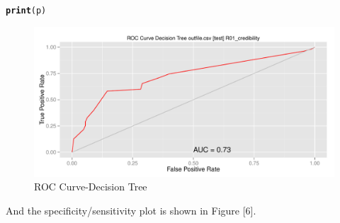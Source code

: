 \documentclass{article}\usepackage[]{graphicx}\usepackage[]{color}
\makeatletter
\def\maxwidth{ %
  \ifdim\Gin@nat@width>\linewidth
    \linewidth
  \else
    \Gin@nat@width
  \fi
}
\newcommand{\hlstd}[1]{\textcolor[rgb]{0.345,0.345,0.345}{#1}}%
\newcommand{\hlkwd}[1]{\textcolor[rgb]{0.737,0.353,0.396}{\textbf{#1}}}%
\newenvironment{kframe}{%
 \def\at@end@of@kframe{}%
 \ifinner\ifhmode%
  \def\at@end@of@kframe{\end{minipage}}%
  \begin{minipage}{\columnwidth}%
 \fi\fi%
 \def\FrameCommand##1{\hskip\@totalleftmargin \hskip-\fboxsep
 \colorbox{shadecolor}{##1}\hskip-\fboxsep
     \hskip-\linewidth \hskip-\@totalleftmargin \hskip\columnwidth}%
 \MakeFramed {\advance\hsize-\width
   \@totalleftmargin\z@ \linewidth\hsize
   \@setminipage}}%
 {\par\unskip\endMakeFramed%
 \at@end@of@kframe}
\newenvironment{knitrout}{}{} %
\makeatother
\begin{document}
\begin{knitrout}
\color{fgcolor}\begin{kframe}
\begin{alltt}
\hlkwd{print}\hlstd{(p)}
\end{alltt}
\end{kframe}\begin{figure}
\includegraphics[width=\maxwidth]{figure/unnamed-chunk-44-1} \caption[ROC Curve-Decision Tree]{ROC Curve-Decision Tree}\label{fig:unnamed-chunk-44}
\end{figure}


\end{knitrout}
And the specificity/sensitivity plot is shown in Figure [6].
\end{document}
